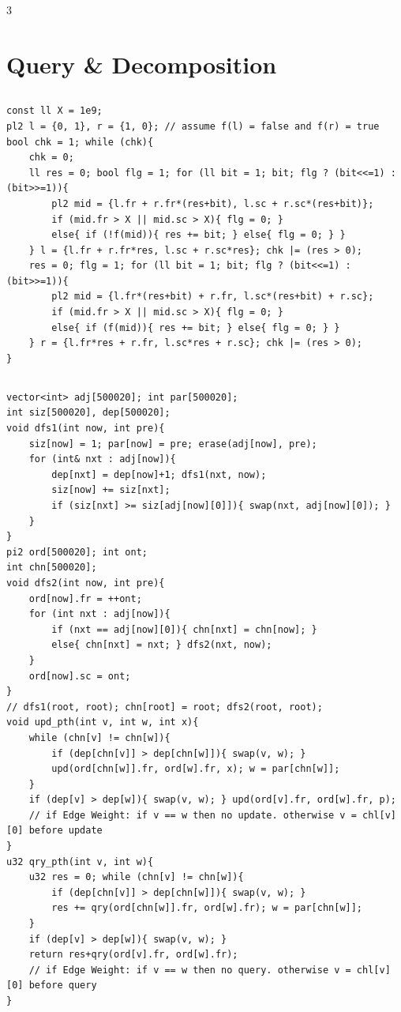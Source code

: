\documentclass[landscape, 8pt, a4paper, oneside]{extarticle}
\begin{document}
\begin{multicols*}{3}
\section{Query \& Decomposition}
\subsection{}
\begin{verbatim}
const ll X = 1e9;
pl2 l = {0, 1}, r = {1, 0}; // assume f(l) = false and f(r) = true
bool chk = 1; while (chk){
    chk = 0;
    ll res = 0; bool flg = 1; for (ll bit = 1; bit; flg ? (bit<<=1) : (bit>>=1)){
        pl2 mid = {l.fr + r.fr*(res+bit), l.sc + r.sc*(res+bit)};
        if (mid.fr > X || mid.sc > X){ flg = 0; }
        else{ if (!f(mid)){ res += bit; } else{ flg = 0; } }
    } l = {l.fr + r.fr*res, l.sc + r.sc*res}; chk |= (res > 0);
    res = 0; flg = 1; for (ll bit = 1; bit; flg ? (bit<<=1) : (bit>>=1)){
        pl2 mid = {l.fr*(res+bit) + r.fr, l.sc*(res+bit) + r.sc};
        if (mid.fr > X || mid.sc > X){ flg = 0; }
        else{ if (f(mid)){ res += bit; } else{ flg = 0; } }
    } r = {l.fr*res + r.fr, l.sc*res + r.sc}; chk |= (res > 0);
}
\end{verbatim}
\subsection{}
\begin{verbatim}
vector<int> adj[500020]; int par[500020];
int siz[500020], dep[500020];
void dfs1(int now, int pre){
	siz[now] = 1; par[now] = pre; erase(adj[now], pre);
	for (int& nxt : adj[now]){
		dep[nxt] = dep[now]+1; dfs1(nxt, now);
		siz[now] += siz[nxt];
		if (siz[nxt] >= siz[adj[now][0]]){ swap(nxt, adj[now][0]); }
	}
}
pi2 ord[500020]; int ont;
int chn[500020];
void dfs2(int now, int pre){
	ord[now].fr = ++ont;
	for (int nxt : adj[now]){
		if (nxt == adj[now][0]){ chn[nxt] = chn[now]; }
		else{ chn[nxt] = nxt; } dfs2(nxt, now);
	}
	ord[now].sc = ont;
}
// dfs1(root, root); chn[root] = root; dfs2(root, root);
void upd_pth(int v, int w, int x){
	while (chn[v] != chn[w]){
		if (dep[chn[v]] > dep[chn[w]]){ swap(v, w); }
		upd(ord[chn[w]].fr, ord[w].fr, x); w = par[chn[w]];
	}
	if (dep[v] > dep[w]){ swap(v, w); } upd(ord[v].fr, ord[w].fr, p);
	// if Edge Weight: if v == w then no update. otherwise v = chl[v][0] before update
}
u32 qry_pth(int v, int w){
	u32 res = 0; while (chn[v] != chn[w]){
		if (dep[chn[v]] > dep[chn[w]]){ swap(v, w); }
		res += qry(ord[chn[w]].fr, ord[w].fr); w = par[chn[w]];
	}
	if (dep[v] > dep[w]){ swap(v, w); }
	return res+qry(ord[v].fr, ord[w].fr);
	// if Edge Weight: if v == w then no query. otherwise v = chl[v][0] before query
}
\end{verbatim}

\end{multicols*}
\end{document}
